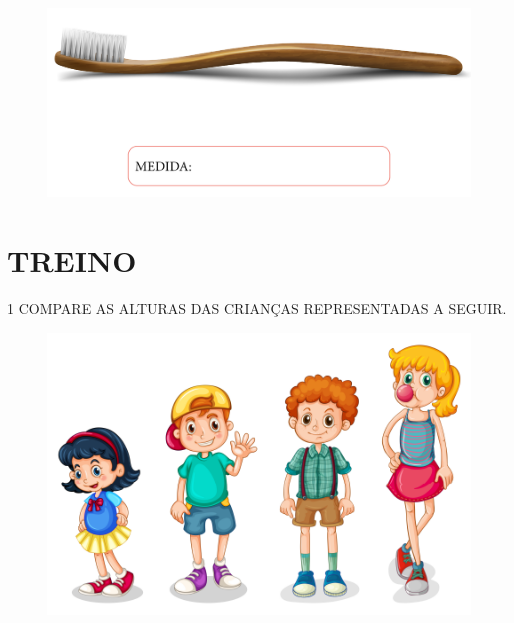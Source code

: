 \begin{figure}[htpb!]
\centering
\includegraphics[width=.7\textwidth]{./media/SAEB_1ANO_MAT_FIGURA42.png}
\end{figure}


\pagebreak
\section{TREINO}

\num{1} COMPARE AS ALTURAS DAS CRIANÇAS REPRESENTADAS A SEGUIR.


\begin{figure}[htpb!]
\centering
\includegraphics[width=\textwidth]{./media/SAEB_1ANO_MAT_FIGURA43.png}
\end{figure}

